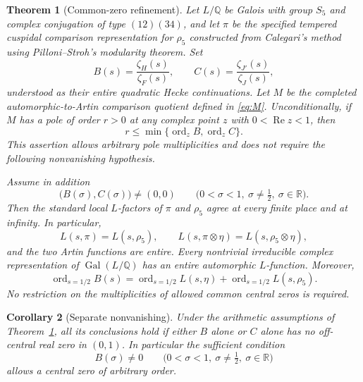 \documentclass[11pt]{article}
\newtheorem{theorem}{Theorem}[section]
\newtheorem{corollary}[theorem]{Corollary}
\theoremstyle{definition}
\theoremstyle{remark}
\newcommand{\Q}{\mathbb Q}
\newcommand{\R}{\mathbb R}
\newcommand{\Gal}{\operatorname{Gal}}
\newcommand{\ord}{\operatorname{ord}}
\newcommand{\rh}{\rho_5}
\newcommand{\Rea}{\operatorname{Re}}
\numberwithin{equation}{section}
\begin{document}
\begin{theorem}[Common-zero refinement]\label{thm:main}
Let $L/\Q$ be Galois with group $S_5$ and complex conjugation of type $(12)(34)$, and let $\pi$ be the specified tempered cuspidal comparison representation for $\rh$ constructed from Calegari's method using Pilloni--Stroh's modularity theorem. Set
\[
B(s)=\frac{\zeta_H(s)}{\zeta_F(s)},\qquad
C(s)=\frac{\zeta_{J'}(s)}{\zeta_J(s)},
\]
understood as their entire quadratic Hecke continuations. Let $M$ be the completed automorphic-to-Artin comparison quotient defined in \eqref{eq:M}. Unconditionally, if $M$ has a pole of order $r>0$ at any complex point $z$ with $0<\Rea z<1$, then
\begin{equation}\label{eq:mainpolebound}
r\le \min\{\ord_z B,\ord_z C\}.
\end{equation}
This assertion allows arbitrary pole multiplicities and does not require the following nonvanishing hypothesis.

Assume in addition
\begin{equation}\label{eq:RBC}
\bigl(B(\sigma),C(\sigma)\bigr)\ne(0,0)
\qquad\bigl(0<\sigma<1,\ \sigma\ne\tfrac12,\ \sigma\in\R\bigr).
\end{equation}
Then the standard local $L$-factors of $\pi$ and $\rh$ agree at every finite place and at infinity. In particular,
\[
L(s,\pi)=L(s,\rh),\qquad
L(s,\pi\otimes\eta)=L(s,\rh\otimes\eta),
\]
and the two Artin functions are entire. Every nontrivial irreducible complex representation of $\Gal(L/\Q)$ has an entire automorphic $L$-function. Moreover,
\begin{equation}\label{eq:orders}
\ord_{s=1/2}B(s)
=\ord_{s=1/2}L(s,\eta)
+\ord_{s=1/2}L(s,\rh).
\end{equation}
No restriction on the multiplicities of allowed common central zeros is required.
\end{theorem}

\begin{corollary}[Separate nonvanishing]\label{cor:separate}
Under the arithmetic assumptions of Theorem~\ref{thm:main}, all its conclusions hold if either $B$ alone or $C$ alone has no off-central real zero in $(0,1)$. In particular the sufficient condition
\begin{equation}\label{eq:RB}
B(\sigma)\ne0\qquad
\bigl(0<\sigma<1,\ \sigma\ne\tfrac12,\ \sigma\in\R\bigr)
\end{equation}
allows a central zero of arbitrary order.
\end{corollary}
\end{document}
